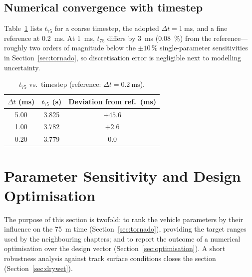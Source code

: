 \subsection{Numerical convergence with timestep}
\label{sec:convergence}

Table~\ref{tab:dt_convergence} lists $t_{75}$ for a coarse timestep, the
adopted $\Delta t=\SI{1}{\milli\second}$, and a fine reference at
\SI{0.2}{\milli\second}. At \SI{1}{\milli\second}, $t_{75}$ differs by
\SI{3}{\milli\second} (\SI{0.08}{\percent}) from the reference---roughly
two orders of magnitude below the $\pm10\,\%$ single-parameter
sensitivities in Section~\ref{sec:tornado}, so discretisation error is
negligible next to modelling uncertainty.

\begin{table}[H]
\centering
\caption{$t_{75}$ vs.\ timestep (reference: $\Delta t=\SI{0.2}{\milli\second}$).}
\label{tab:dt_convergence}
\begingroup
\scriptsize
\setlength{\tabcolsep}{3pt}
\renewcommand{\arraystretch}{0.88}
\begin{tabular}{|c|c|c|}
\hline
$\Delta t$ (ms) & $t_{75}$ (s) & Deviation from ref.\ (ms) \\
\hline
5.00 & 3.825 & $+45.6$ \\
1.00 & 3.782 & $+2.6$ \\
0.20 & 3.779 & $0.0$ \\
\hline
\end{tabular}
\endgroup
\end{table}

\section{Parameter Sensitivity and Design Optimisation}
\label{sec:sensitivity}

The purpose of this section is twofold: to rank the vehicle
parameters by their influence on the \SI{75}{\metre} time
(Section~\ref{sec:tornado}), providing the target ranges used by the
neighbouring chapters; and to report the outcome of a numerical
optimisation over the design vector
(Section~\ref{sec:optimisation}). A short robustness analysis
against track surface conditions closes the section
(Section~\ref{sec:drywet}).

